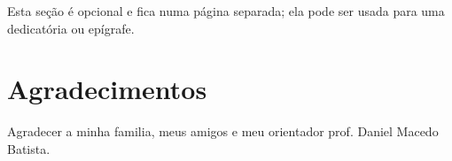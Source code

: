 

\begin{dedicatoria}
    Esta seção é opcional e fica numa página separada; ela pode ser usada para
    uma dedicatória ou epígrafe.
    \end{dedicatoria}
    
    
    \chapter*{Agradecimentos}
    
    Agradecer a minha familia, meus amigos e meu orientador prof. Daniel Macedo Batista.
    
    \printResumoAbstract
    
    
    
    \makeatletter
    \if@openright\cleardoublepage\else\clearpage\fi
    \makeatother
    
    
